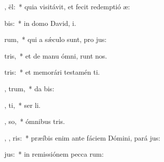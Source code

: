 \item {} ,  ël:~* quia visitávit, et fecit redemptió  æ:
\item {}    bis:~* in domo David,  i.
\item {}     rum,~* qui a sǽculo sunt, pro jus:
\item {}   tris,~* et de manu ómni,  runt nos.
\item {}     tris:~* et memorári testamén  ti.
\item {},      trum,~* da  bis:
\item {}  ,     ti,~* ser li.
\item {} ,    so,~* ómnibus  tris.
\item {} , ,   ris:~* præíbis enim ante fáciem Dómini, pará  jus:
\item {}     jus:~* in remissiónem pecca rum:
